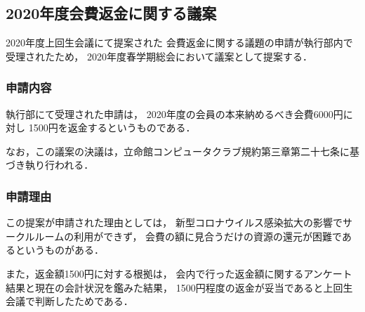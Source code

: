 \subsection*{2020年度会費返金に関する議案}

2020年度上回生会議にて提案された
会費返金に関する議題の申請が執行部内で受理されたため，
2020年度春学期総会において議案として提案する．

\subsubsection*{申請内容}
執行部にて受理された申請は，
2020年度の会員の本来納めるべき会費6000円に対し
1500円を返金するというものである．

なお，この議案の決議は，立命館コンピュータクラブ規約第三章第二十七条に基づき執り行われる．

\subsubsection*{申請理由}
この提案が申請された理由としては，
新型コロナウイルス感染拡大の影響でサークルルームの利用ができず，
会費の額に見合うだけの資源の還元が困難であるというものがある．

また，返金額1500円に対する根拠は，
会内で行った返金額に関するアンケート結果と現在の会計状況を鑑みた結果，
1500円程度の返金が妥当であると上回生会議で判断したためである．

